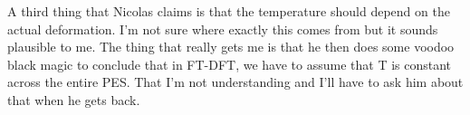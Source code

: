 A third thing that Nicolas claims is that the temperature should depend on the actual deformation. I'm not sure where exactly this comes from but it sounds plausible to me. The thing that really gets me is that he then does some voodoo black magic to conclude that in FT-DFT, we have to assume that T is constant across the entire PES. That I'm not understanding and I'll have to ask him about that when he gets back.